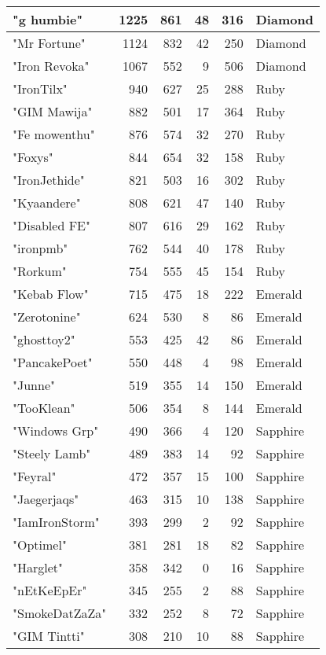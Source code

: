\documentclass{article}
\begin{document}
\begin{table}[htbp]
\begin{tabular}{|l|r|r|r|r|l|}
"g humbie" & 1225 & 861 & 48 & 316 & Diamond \\ \hline
"Mr Fortune" & 1124 & 832 & 42 & 250 & Diamond \\ \hline
"Iron Revoka" & 1067 & 552 & 9 & 506 & Diamond \\ \hline
"IronTilx" & 940 & 627 & 25 & 288 & Ruby \\ \hline
"GIM Mawija" & 882 & 501 & 17 & 364 & Ruby \\ \hline
"Fe mowenthu" & 876 & 574 & 32 & 270 & Ruby \\ \hline
"Foxys" & 844 & 654 & 32 & 158 & Ruby \\ \hline
"IronJethide" & 821 & 503 & 16 & 302 & Ruby \\ \hline
"Kyaandere" & 808 & 621 & 47 & 140 & Ruby \\ \hline
"Disabled FE" & 807 & 616 & 29 & 162 & Ruby \\ \hline
"ironpmb" & 762 & 544 & 40 & 178 & Ruby \\ \hline
"Rorkum" & 754 & 555 & 45 & 154 & Ruby \\ \hline
"Kebab Flow" & 715 & 475 & 18 & 222 & Emerald \\ \hline
"Zerotonine" & 624 & 530 & 8 & 86 & Emerald \\ \hline
"ghosttoy2" & 553 & 425 & 42 & 86 & Emerald \\ \hline
"PancakePoet" & 550 & 448 & 4 & 98 & Emerald \\ \hline
"Junne" & 519 & 355 & 14 & 150 & Emerald \\ \hline
"TooKlean" & 506 & 354 & 8 & 144 & Emerald \\ \hline
"Windows Grp" & 490 & 366 & 4 & 120 & Sapphire \\ \hline
"Steely Lamb" & 489 & 383 & 14 & 92 & Sapphire \\ \hline
"Feyral" & 472 & 357 & 15 & 100 & Sapphire \\ \hline
"Jaegerjaqs" & 463 & 315 & 10 & 138 & Sapphire \\ \hline
"IamIronStorm" & 393 & 299 & 2 & 92 & Sapphire \\ \hline
"Optimel" & 381 & 281 & 18 & 82 & Sapphire \\ \hline
"Harglet" & 358 & 342 & 0 & 16 & Sapphire \\ \hline
"nEtKeEpEr" & 345 & 255 & 2 & 88 & Sapphire \\ \hline
"SmokeDatZaZa" & 332 & 252 & 8 & 72 & Sapphire \\ \hline
"GIM Tintti" & 308 & 210 & 10 & 88 & Sapphire \\ \hline

\end{tabular}
\end{table}
\end{document}
